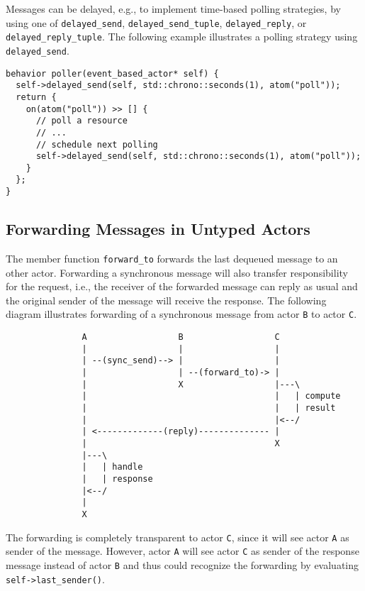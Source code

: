 Messages can be delayed, e.g., to implement time-based polling strategies, by using one of \lstinline^delayed_send^, \lstinline^delayed_send_tuple^, \lstinline^delayed_reply^, or \lstinline^delayed_reply_tuple^.
The following example illustrates a polling strategy using \lstinline^delayed_send^.

\begin{lstlisting}
behavior poller(event_based_actor* self) {
  self->delayed_send(self, std::chrono::seconds(1), atom("poll"));
  return {
    on(atom("poll")) >> [] {
      // poll a resource
      // ...
      // schedule next polling
      self->delayed_send(self, std::chrono::seconds(1), atom("poll"));
    }
  };
}
\end{lstlisting}

\clearpage
\subsection{Forwarding Messages in Untyped Actors}

The member function \lstinline^forward_to^ forwards the last dequeued message to an other actor.
Forwarding a synchronous message will also transfer responsibility for the request, i.e., the receiver of the forwarded message can reply as usual and the original sender of the message will receive the response.
The following diagram illustrates forwarding of a synchronous message from actor \texttt{B} to actor \texttt{C}.

\begin{footnotesize}
\begin{verbatim}
               A                  B                  C
               |                  |                  |
               | --(sync_send)--> |                  |
               |                  | --(forward_to)-> |
               |                  X                  |---\
               |                                     |   | compute
               |                                     |   | result
               |                                     |<--/
               | <-------------(reply)-------------- |
               |                                     X
               |---\
               |   | handle
               |   | response
               |<--/
               |
               X
\end{verbatim}
\end{footnotesize}

The forwarding is completely transparent to actor \texttt{C}, since it will see actor \texttt{A} as sender of the message.
However, actor \texttt{A} will see actor \texttt{C} as sender of the response message instead of actor \texttt{B} and thus could recognize the forwarding by evaluating \lstinline^self->last_sender()^.
